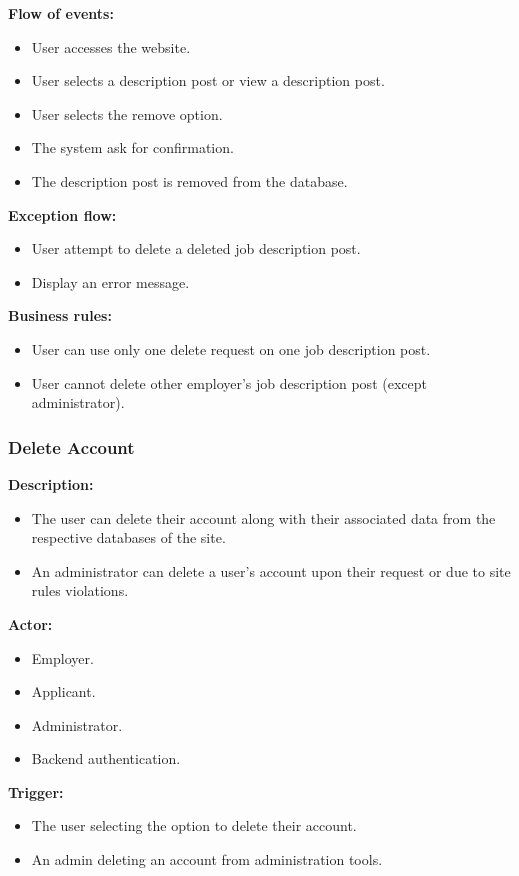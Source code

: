 \documentclass[a4paper]{article}
\begin{document}
\textbf{Flow of events:}
\begin{itemize}
  \item User accesses the website.
  \item User selects a description post or view a description post.
  \item User selects the remove option.
  \item The system ask for confirmation.
  \item The description post is removed from the database.
\end{itemize}

\textbf{Exception flow:}
\begin{itemize}
  \item User attempt to delete a deleted job description post.
  \item Display an error message.
\end{itemize}

\textbf{Business rules:}
\begin{itemize}
  \item User can use only one delete request on one job description post.
  \item User cannot delete other employer's job description post (except administrator).
\end{itemize}

\subsubsection{Delete Account}
\textbf{Description:}
\begin{itemize}
  \item The user can delete their account along with their associated data from the respective databases of the site.
  \item An administrator can delete a user's account upon their request or due to site rules violations.
\end{itemize}

\textbf{Actor:}
\begin{itemize}
  \item Employer.
  \item Applicant.
  \item Administrator.
  \item Backend authentication.
\end{itemize}

\textbf{Trigger:}
\begin{itemize}
  \item The user selecting the option to delete their account.
  \item An admin deleting an account from administration tools.
\end{itemize}
\end{document}
